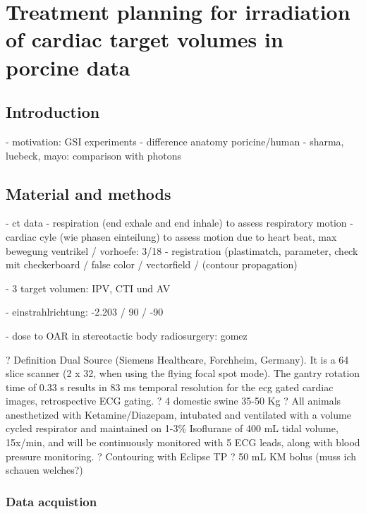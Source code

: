 \documentclass[type=dr, dr=rernat, accentcolor=tud7b,colorbacktitle, bigchapter, openright, twoside, 12pt ]{tudthesis}
\begin{document}
\dominitoc
\setcounter{tocdepth}{1}
\tableofcontents

\chapter{Treatment planning for irradiation of cardiac target volumes in porcine data}
\minitoc

\section{Introduction}

- motivation: GSI experiments
- difference anatomy poricine/human
- sharma, luebeck, mayo: comparison with photons

\section{Material and methods}

- ct data
- respiration (end exhale and end inhale) to assess respiratory motion
- cardiac cyle (wie phasen einteilung) to assess motion due to heart beat, max bewegung ventrikel / vorhoefe: 3/18
- registration (plastimatch, parameter, check mit checkerboard / false color / vectorfield / (contour propagation)

- 3 target volumen: IPV, CTI und AV

- einstrahlrichtung: -2.203 / 90 / -90

- dose to OAR in stereotactic body radiosurgery: gomez




?	Definition Dual Source (Siemens Healthcare, Forchheim, Germany).  It is a 64 slice scanner (2 x 32, when using the flying focal spot mode). The gantry rotation time of 0.33 s results in 83 ms temporal resolution for the ecg gated cardiac images, retrospective ECG gating.
?	4 domestic swine 35-50 Kg
?	All animals anesthetized with Ketamine/Diazepam, intubated and ventilated with a volume cycled respirator and maintained on 1-3\% Isoflurane of 400 mL tidal volume, 15x/min, and will be continuously monitored with 5 ECG leads, along with blood pressure monitoring.
?	Contouring with Eclipse TP
?	50 mL KM bolus (muss ich schauen welches?)





\subsection{Data acquistion}
\end{document}
